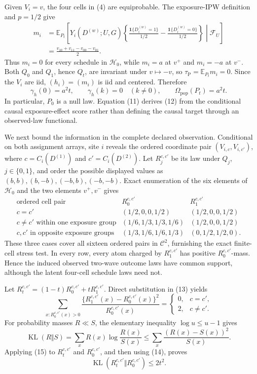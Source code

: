 Given \(V_i=v\), the four cells in (4) are equiprobable.  The exposure-IPW definition and \(p=1/2\) give
\[
 \begin{aligned}
 m_i
 &=\mathbb E_{P_t}\!\left[
  Y_i(D^{(w)};U,G)
  \left\{
   \frac{\mathbf 1\{D_i^{(w)}=1\}}{1/2}
   -\frac{\mathbf 1\{D_i^{(w)}=0\}}{1/2}
  \right\}
  \middle|\mathcal F_U
 \right]\\
 &=\frac{v_{10}+v_{11}-v_{00}-v_{01}}2.
 \end{aligned} \tag{11}
\]
Thus \(m_i=0\) for every schedule in \(\mathcal H_0\), while \(m_i=a\) at \(v^+\) and \(m_i=-a\) at \(v^-\).  Both \(Q_0\) and \(Q_1\), hence \(Q_t\), are invariant under \(v\mapsto-v\), so \(\tau_{\mathrm P}=\mathbb E_{P_t}m_i=0\).  Since the \(V_i\) are iid, \((h_i)=(m_i)\) is iid and centered.  Therefore
\[
 \gamma_h(0)=a^2t,
 \qquad
 \gamma_h(k)=0\quad(k\ne0),
 \qquad
 \Omega_{\mathrm{pop}}(P_t)=a^2t. \tag{12}
\]
In particular, \(P_0\) is a null law.  Equation (11) derives (12) from the conditional causal exposure-effect score rather than defining the causal target through an observed-law functional.

We next bound the information in the complete declared observation.  Conditional on both assignment arrays, site \(i\) reveals the ordered coordinate pair \((V_{i,c},V_{i,c'})\), where \(c=C_i(D^{(1)})\) and \(c'=C_i(D^{(2)})\).  Let \(R_j^{c,c'}\) be its law under \(Q_j\), \(j\in\{0,1\}\), and order the possible displayed values as \((b,b),(b,-b),(-b,b),(-b,-b)\).  Exact enumeration of the six elements of \(\mathcal H_0\) and the two elements \(v^+,v^-\) gives
\[
\begin{array}{c|c|c}
\text{ordered cell pair}&R_0^{c,c'}&R_1^{c,c'}\\ \hline
c=c'&(1/2,0,0,1/2)&(1/2,0,0,1/2)\\
c\ne c'\text{ within one exposure group}
 &(1/6,1/3,1/3,1/6)&(1/2,0,0,1/2)\\
c,c'\text{ in opposite exposure groups}
 &(1/3,1/6,1/6,1/3)&(0,1/2,1/2,0).
\end{array} \tag{13}
\]
These three cases cover all sixteen ordered pairs in \(\mathcal C^2\), furnishing the exact finite-cell stress test.  In every row, every atom charged by \(R_1^{c,c'}\) has positive \(R_0^{c,c'}\)-mass.  Hence the induced observed two-wave outcome laws have common support, although the latent four-cell schedule laws need not.

Let \(R_t^{c,c'}=(1-t)R_0^{c,c'}+tR_1^{c,c'}\).  Direct substitution in (13) yields
\[
 \sum_{x:R_0^{c,c'}(x)>0}
 \frac{\{R_1^{c,c'}(x)-R_0^{c,c'}(x)\}^2}
      {R_0^{c,c'}(x)}
 =\begin{cases}
   0,&c=c',\\
   2,&c\ne c'.
  \end{cases} \tag{14}
\]
For probability masses \(R\ll S\), the elementary inequality \(\log u\le u-1\) gives
\[
 \operatorname{KL}(R\Vert S)
 =\sum_xR(x)\log\frac{R(x)}{S(x)}
 \le\sum_x\frac{(R(x)-S(x))^2}{S(x)}. \tag{15}
\]
Applying (15) to \(R_t^{c,c'}\) and \(R_0^{c,c'}\), and then using (14), proves
\[
 \operatorname{KL}(R_t^{c,c'}\Vert R_0^{c,c'})\le2t^2. \tag{16}
\]

